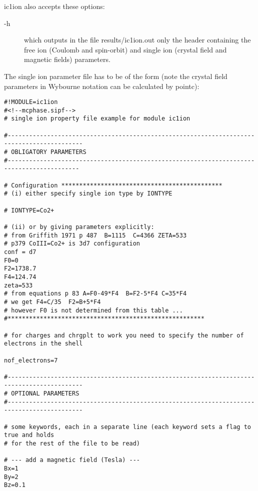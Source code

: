 {\prg ic1ion} also accepts these options: 
\begin{description}
\item[{\prg -h}] which outputs in the file {\prg results/ic1ion.out} only
the header containing the free ion (Coulomb and spin-orbit) and single ion (crystal field and magnetic fields)
parameters. 
\end{description}
The single ion parameter file has to be of the form (note the crystal field parameters in Wybourne notation
can be calculated by {\prg pointc}):
{\footnotesize
\begin{verbatim}
#!MODULE=ic1ion
#<!--mcphase.sipf-->
# single ion property file example for module ic1ion

#-------------------------------------------------------------------------------------------
# OBLIGATORY PARAMETERS
#------------------------------------------------------------------------------------------

# Configuration *********************************************
# (i) either specify single ion type by IONTYPE 

# IONTYPE=Co2+

# (ii) or by giving parameters explicitly:
# from Griffith 1971 p 487  B=1115  C=4366 ZETA=533
# p379 CoIII=Co2+ is 3d7 configuration
conf = d7
F0=0
F2=1738.7
F4=124.74
zeta=533
# from equations p 83 A=F0-49*F4  B=F2-5*F4 C=35*F4
# we get F4=C/35  F2=B+5*F4
# however F0 is not determined from this table ...
#*******************************************************

# for charges and chrgplt to work you need to specify the number of electrons in the shell

nof_electrons=7

#-------------------------------------------------------------------------------------------
# OPTIONAL PARAMETERS
#-------------------------------------------------------------------------------------------

# some keywords, each in a separate line (each keyword sets a flag to true and holds
# for the rest of the file to be read)

# --- add a magnetic field (Tesla) ---
Bx=1
By=2
Bz=0.1


\end{verbatim}}
